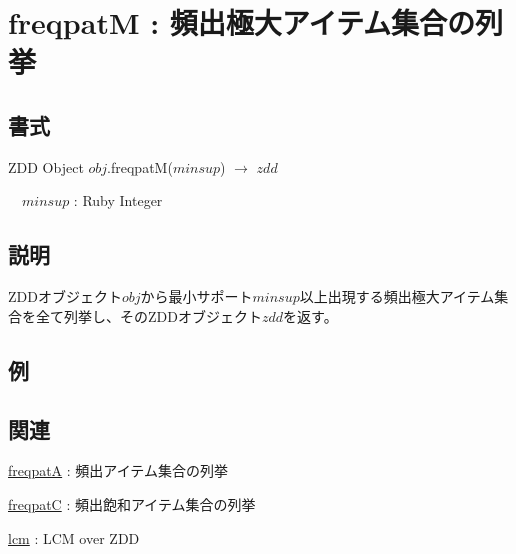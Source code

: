 
\section{freqpatM : 頻出極大アイテム集合の列挙\label{sect:freqpatM}}
\subsection*{書式}
ZDD Object $obj$.freqpatM($minsup$) $\rightarrow$ $zdd$

~~$minsup$ : Ruby Integer

\subsection*{説明}
ZDDオブジェクト$obj$から最小サポート$minsup$以上出現する頻出極大アイテム集合を全て列挙し、そのZDDオブジェクト$zdd$を返す。


\subsection*{例}


\subsection*{関連}
\hyperref[sect:freqpatA]{freqpatA} : 頻出アイテム集合の列挙

\hyperref[sect:freqpatC]{freqpatC} : 頻出飽和アイテム集合の列挙

\hyperref[sect:lcm]{lcm} : LCM over ZDD
